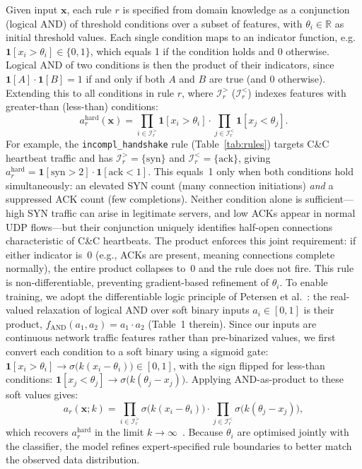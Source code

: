 \documentclass[conference]{IEEEtran}
\begin{document}
Given input $\mathbf{x}$, each rule $r$ is specified from domain knowledge
as a conjunction (logical AND) of threshold conditions over a subset of
features, with $\theta_i\in\mathbb{R}$ as initial threshold values.
Each single condition maps to an indicator function, e.g.\
$\mathbf{1}[x_i{>}\theta_i]\in\{0,1\}$, which equals 1 if the condition
holds and 0 otherwise. Logical AND of two conditions is then the product
of their indicators, since $\mathbf{1}[A]\cdot\mathbf{1}[B]=1$ if and only
if both $A$ and $B$ are true (and 0 otherwise). Extending this to all
conditions in rule $r$, where $\mathcal{I}_r^{>}$ ($\mathcal{I}_r^{<}$)
indexes features with greater-than (less-than) conditions:
\[
  a_r^{\mathrm{hard}}(\mathbf{x}) =
    \prod_{i\in\mathcal{I}_r^{>}}\!\mathbf{1}[x_i{>}\theta_i]\cdot
    \prod_{j\in\mathcal{I}_r^{<}}\!\mathbf{1}[x_j{<}\theta_j].
\]
For example, the \texttt{incompl\_handshake} rule (Table~\ref{tab:rules})
targets C\&C heartbeat traffic and has
$\mathcal{I}_r^{>}{=}\{\mathrm{syn}\}$ and
$\mathcal{I}_r^{<}{=}\{\mathrm{ack}\}$, giving
$a_r^{\mathrm{hard}}{=}\mathbf{1}[\mathrm{syn}{>}2]\cdot\mathbf{1}[\mathrm{ack}{<}1]$.
This equals~1 only when both conditions hold simultaneously: an elevated
SYN count (many connection initiations) \emph{and} a suppressed ACK count
(few completions). Neither condition alone is sufficient---high SYN traffic
can arise in legitimate servers, and low ACKs appear in normal UDP
flows---but their conjunction uniquely identifies half-open connections
characteristic of C\&C heartbeats. The product enforces this joint
requirement: if either indicator is~0 (e.g., ACKs are present, meaning
connections complete normally), the entire product collapses to~0 and the
rule does not fire.
This rule is non-differentiable, preventing gradient-based refinement of
$\theta_i$. To enable training, we adopt the differentiable logic principle
of Petersen et al.~\cite{petersen2022logic}: the real-valued relaxation of
logical AND over soft binary inputs $a_i\in[0,1]$ is their product,
$f_{\mathrm{AND}}(a_1,a_2)=a_1{\cdot}a_2$ (Table~1 therein). Since our
inputs are continuous network traffic features rather than pre-binarized
values, we first convert each condition to a soft binary using a sigmoid
gate: $\mathbf{1}[x_i{>}\theta_i]\to\sigma\!\bigl(k(x_i{-}\theta_i)\bigr)
\in[0,1]$, with the sign flipped for less-than conditions:
$\mathbf{1}[x_j{<}\theta_j]\to\sigma\!\bigl(k(\theta_j{-}x_j)\bigr)$.
Applying AND-as-product to these soft values gives:
\begin{equation}
  a_r(\mathbf{x};k) =
    \prod_{i\in\mathcal{I}_r^{>}}\!\sigma\!\bigl(k(x_i{-}\theta_i)\bigr)\cdot
    \prod_{j\in\mathcal{I}_r^{<}}\!\sigma\!\bigl(k(\theta_j{-}x_j)\bigr),
  \label{eq:rule_score}
\end{equation}
which recovers $a_r^{\mathrm{hard}}$ in the limit $k\to\infty$~\cite{yang2022ste}.
Because $\theta_i$ are optimised jointly with the classifier, the model
refines expert-specified rule boundaries to better match the observed
data distribution.
\end{document}
